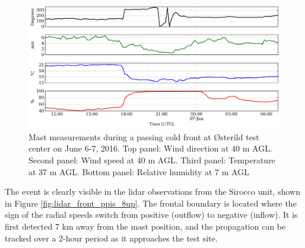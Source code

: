 \begin{figure}[htbp]
    \centering
        \includegraphics[width=1.0\textwidth]{graphics/results/balcony-addendum/balcony_front_mast.png}
    \caption{Mast measurements during a passing cold front at {\O}sterild test center on June 6-7, 2016.
    Top panel: Wind direction at 40 m AGL. Second panel: Wind speed at 40 m AGL. Third panel: Temperature at 37 m AGL. Bottom panel: Relative humidity at 7 m AGL}
    \label{fig:balcony-front-mast}
\end{figure}

The event is clearly visible in the lidar observations from the Sirocco unit, shown in Figure \ref{fig:lidar_front_ppis_8up}. The frontal boundary is located where the sign of the radial speeds switch from positive (outflow) to negative (inflow). It is first detected 7 km away from the mast position, and the propagation can be tracked over a 2-hour period as it approaches the test site.


